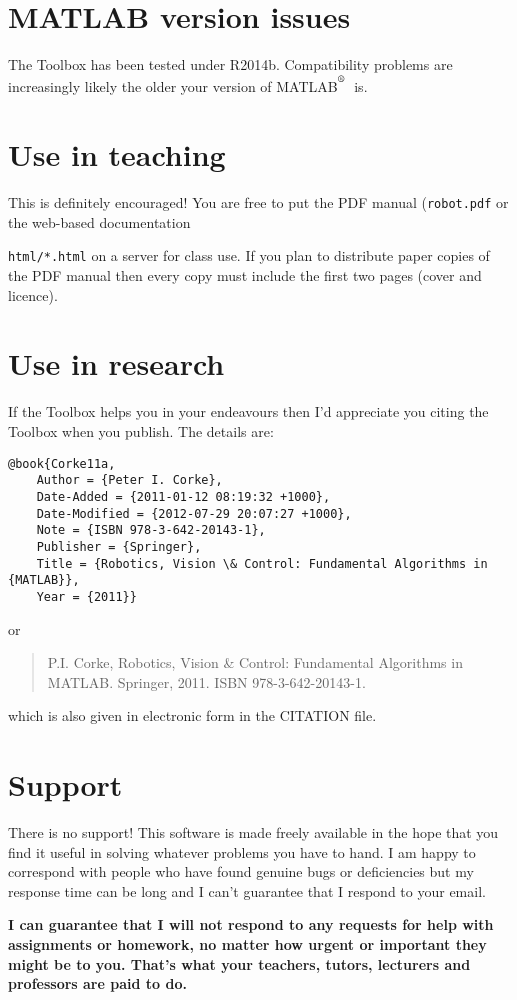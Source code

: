 \documentclass[a4paper]{report}
\def\Mlab{MATLAB$^{\textsuperscript{\textregistered}}$}
\begin{document}
\section{MATLAB version issues}
The Toolbox has been tested under R2014b.  Compatibility problems are increasingly likely the older your version of \Mlab\ is.

\section{Use in teaching}
This is definitely encouraged!
You are free to put the PDF manual (\texttt{robot.pdf} or the web-based documentation {\texttt{html/*.html} on a server for class
use.
If you plan to distribute paper copies of the PDF manual then every copy must include the first two pages (cover and licence).

\section{Use in research}
If the Toolbox helps you in your endeavours then I'd appreciate you citing the Toolbox when you publish.
The details are:
\begin{verbatim}
@book{Corke11a,
    Author = {Peter I. Corke},
    Date-Added = {2011-01-12 08:19:32 +1000},
    Date-Modified = {2012-07-29 20:07:27 +1000},
    Note = {ISBN 978-3-642-20143-1},
    Publisher = {Springer},
    Title = {Robotics, Vision \& Control: Fundamental Algorithms in {MATLAB}},
    Year = {2011}}
\end{verbatim}
or
\begin{quote}
P.I. Corke, Robotics, Vision \& Control: Fundamental Algorithms in MATLAB. Springer, 2011. ISBN 978-3-642-20143-1.
\end{quote}
which is also given in electronic form in the CITATION file.

\section{Support}
There is no support!  This software is made freely available in the hope that you find it useful in solving whatever problems
you have to hand.
I am happy to correspond with people who have found genuine
bugs or deficiencies but my response time can be long and I can't guarantee that I respond to your email.

\textbf{I can guarantee that I will not respond to any requests for help with assignments or homework, no matter
how urgent or important they might be to you.  That's what your teachers, tutors, lecturers and professors are paid to do.}

}
\end{document}
